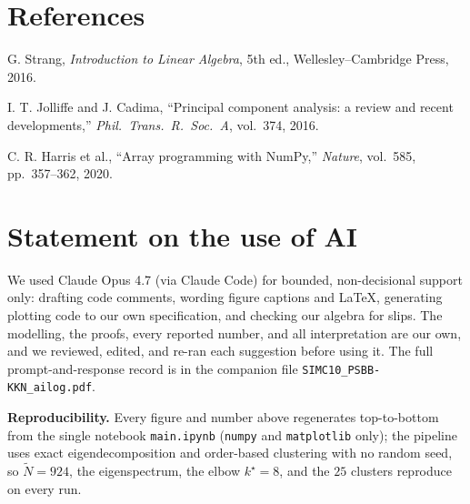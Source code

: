 \documentclass[12pt,a4paper]{article}
\theoremstyle{definition}
\newcommand{\Nt}{\widetilde{N}}
\begin{document}
\section*{References}
\begin{enumerate}[leftmargin=*, label={[\arabic*]}, itemsep=0pt, topsep=1pt]
\item G. Strang, \textit{Introduction to Linear Algebra}, 5th ed., Wellesley--Cambridge Press, 2016.
\item I. T. Jolliffe and J. Cadima, ``Principal component analysis: a review and recent developments,'' \textit{Phil.\ Trans.\ R.\ Soc.\ A}, vol.\ 374, 2016.
\item C. R. Harris et al., ``Array programming with NumPy,'' \textit{Nature}, vol.\ 585, pp.\ 357--362, 2020.
\end{enumerate}

\section*{Statement on the use of AI}
We used Claude Opus 4.7 (via Claude Code) for bounded, non-decisional support only: drafting code
comments, wording figure captions and \LaTeX, generating plotting code to our own specification, and
checking our algebra for slips. The modelling, the proofs, every reported number, and all
interpretation are our own, and we reviewed, edited, and re-ran each suggestion before using it. The
full prompt-and-response record is in the companion file \texttt{SIMC10\_PSBB-KKN\_ailog.pdf}.

\textbf{Reproducibility.} Every figure and number above regenerates top-to-bottom from the single
notebook \texttt{main.ipynb} (\texttt{numpy} and \texttt{matplotlib} only); the pipeline uses exact
eigendecomposition and order-based clustering with no random seed, so $\Nt=924$, the eigenspectrum,
the elbow $k^\star=8$, and the $25$ clusters reproduce on every run.
\end{document}
